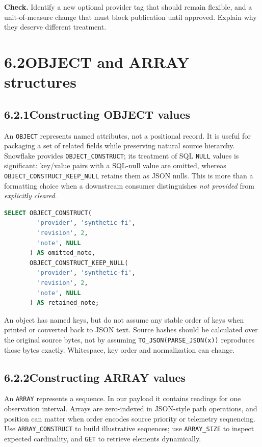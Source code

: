 \documentclass[11pt,twoside]{article}
\newcommand{\topic}[2]{\subsection*{#1\quad #2}}
\begin{document}
\textbf{Check.} Identify a new optional provider tag that should remain flexible, and a unit-of-measure change that must block publication until approved. Explain why they deserve different treatment.
\newpage
\section*{6.2\quad OBJECT and ARRAY structures}
\topic{6.2.1}{Constructing OBJECT values}
An \texttt{OBJECT} represents named attributes, not a positional record. It is useful for packaging a set of related fields while preserving natural source hierarchy. Snowflake provides \texttt{OBJECT\_CONSTRUCT}; its treatment of SQL \texttt{NULL} values is significant: key/value pairs with a SQL-null value are omitted, whereas \texttt{OBJECT\_CONSTRUCT\_KEEP\_NULL} retains them as JSON nulls. This is more than a formatting choice when a downstream consumer distinguishes \emph{not provided} from \emph{explicitly cleared}.

\begin{lstlisting}[language=SQL,caption={Construct a compact provider object with explicit null behavior.}]
SELECT OBJECT_CONSTRUCT(
         'provider', 'synthetic-fi',
         'revision', 2,
         'note', NULL
       ) AS omitted_note,
       OBJECT_CONSTRUCT_KEEP_NULL(
         'provider', 'synthetic-fi',
         'revision', 2,
         'note', NULL
       ) AS retained_note;
\end{lstlisting}
An object has named keys, but do not assume any stable order of keys when printed or converted back to JSON text. Source hashes should be calculated over the original source bytes, not by assuming \texttt{TO\_JSON(PARSE\_JSON(x))} reproduces those bytes exactly. Whitespace, key order and normalization can change.

\topic{6.2.2}{Constructing ARRAY values}
An \texttt{ARRAY} represents a sequence. In our payload it contains readings for one observation interval. Arrays are zero-indexed in JSON-style path operations, and position can matter when order encodes source priority or telemetry sequencing. Use \texttt{ARRAY\_CONSTRUCT} to build illustrative sequences; use \texttt{ARRAY\_SIZE} to inspect expected cardinality, and \texttt{GET} to retrieve elements dynamically.
\end{document}
